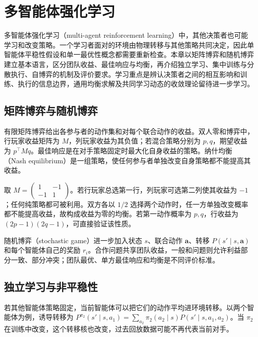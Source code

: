 \setcounter{chapter}{22} %
\chapter{多智能体强化学习}
\label{ch:rl-multiagent}

多智能体强化学习（multi-agent reinforcement learning）中，其他决策者也可能学习和改变策略。一个学习者面对的环境由物理转移与其他策略共同决定，因此单智能体平稳性假设和单一最优性概念都需要重新检查。本章以矩阵博弈和随机博弈建立基本语言，区分团队收益、最佳响应与均衡，再介绍独立学习、集中训练与分散执行、自博弈的机制及评价要求。学习重点是辨认决策者之间的相互影响和训练、执行的信息边界，通用均衡求解及共同学习动态的收敛理论留待进一步学习。

\section{矩阵博弈与随机博弈}

有限矩阵博弈给出各参与者的动作集和对每个联合动作的收益。双人零和博弈中，行玩家收益矩阵为 $M$，列玩家收益为其负值；若混合策略分别为 $p,q$，期望收益为 $p^\top Mq$。最佳响应是在对手策略固定时最大化自身收益的策略。纳什均衡（Nash equilibrium）是一组策略，使任何参与者单独改变自身策略都不能提高其收益。

\begin{example}[为什么均衡可能需要随机化]
取 $M=\left(\begin{smallmatrix}1&-1\\-1&1\end{smallmatrix}\right)$。若行玩家总选第一行，列玩家可选第二列使其收益为 $-1$；任何纯策略都可被利用。双方各以 $1/2$ 选择两个动作时，任一方单独改变概率都不能提高收益，故构成收益为零的均衡。若第一动作概率为 $p,q$，行收益为 $(2p-1)(2q-1)$，可直接验证该性质。
\end{example}

随机博弈（stochastic game）进一步加入状态 $s$、联合动作 $\boldsymbol a$、转移 $P(s'\mid s,\boldsymbol a)$ 和每个智能体自己的奖励 $r_i$。合作问题共享团队收益，一般和问题则允许利益部分一致、部分冲突；团队最优、单方最佳响应和均衡是不同评价标准。

\section{独立学习与非平稳性}

若其他智能体策略固定，当前智能体可以把它们的动作平均进环境转移。以两个智能体为例，诱导转移为 $P^{\pi_2}(s'\mid s,a_1)=\sum_{a_2}\pi_2(a_2\mid s)P(s'\mid s,a_1,a_2)$。当 $\pi_2$ 在训练中改变，这个转移核也改变，过去回放数据可能不再代表当前对手。

